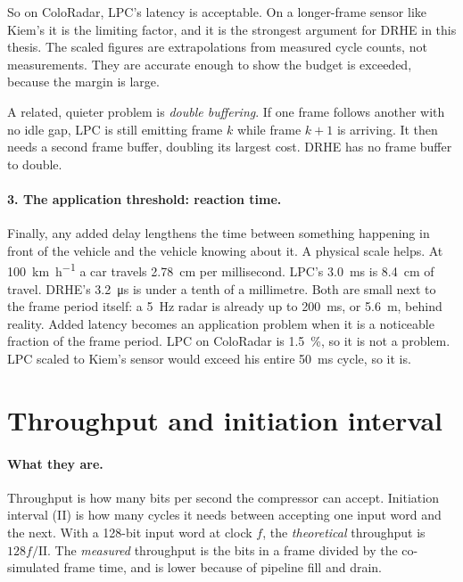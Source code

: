 \noindent
So on ColoRadar, LPC's latency is acceptable. On a longer-frame sensor like
Kiem's it is the limiting factor, and it is the strongest argument for DRHE in
this thesis. The scaled figures are extrapolations from measured cycle counts,
not measurements. They are accurate enough to show the budget is exceeded,
because the margin is large.

A related, quieter problem is \emph{double buffering}. If one frame follows
another with no idle gap, LPC is still emitting frame $k$ while frame $k+1$ is
arriving. It then needs a second frame buffer, doubling its largest cost.
DRHE has no frame buffer to double.

\paragraph{3. The application threshold: reaction time.} Finally, any added
delay lengthens the time between something happening in front of the vehicle
and the vehicle knowing about it. A physical scale helps. At
\SI{100}{\kilo\metre\per\hour} a car travels \SI{2.78}{\centi\metre} per
millisecond. LPC's \SI{3.0}{\milli\second} is \SI{8.4}{\centi\metre} of
travel. DRHE's \SI{3.2}{\micro\second} is under a tenth of a millimetre. Both
are small next to the frame period itself: a \SI{5}{\hertz} radar is already
up to \SI{200}{\milli\second}, or \SI{5.6}{\metre}, behind reality. Added
latency becomes an application problem when it is a noticeable fraction of the
frame period. LPC on ColoRadar is \SI{1.5}{\percent}, so it is not a problem.
LPC scaled to Kiem's sensor would exceed his entire \SI{50}{\milli\second}
cycle, so it is.


\section{Throughput and initiation interval}
\label{sec:thrinterp}

\paragraph{What they are.} Throughput is how many bits per second the
compressor can accept. Initiation interval (II) is how many cycles it needs
between accepting one input word and the next. With a 128-bit input word at
clock $f$, the \emph{theoretical} throughput is $128 f / \mathrm{II}$. The
\emph{measured} throughput is the bits in a frame divided by the co-simulated
frame time, and is lower because of pipeline fill and drain.

